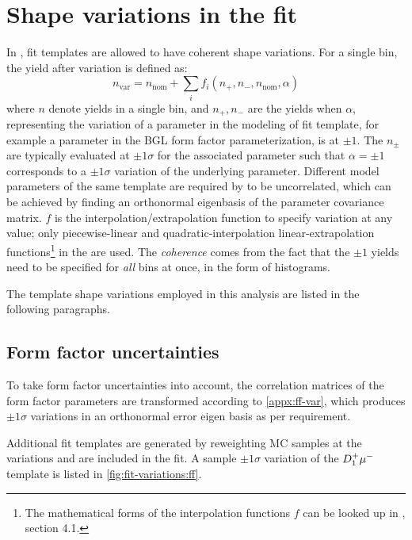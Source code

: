 \section{Shape variations in the fit}
\label{ref:fit:var}

In \HistFactory, fit templates are allowed to have coherent shape variations.
For a single bin, the yield after variation is defined as:
\begin{equation}
    n_\text{var} = n_\text{nom} + \sum_i f_i(n_+, n_-, n_\text{nom}, \alpha)
\end{equation}
where $n$ denote yields in a single bin, and
$n_+, n_-$ are the yields when $\alpha$,
representing the variation of a parameter in the modeling of fit template,
for example a parameter in the BGL form factor parameterization,
is at $\pm 1$.
The $n_\pm$ are typically evaluated at $\pm 1 \sigma$ for the associated
parameter such that $\alpha = \pm 1$ corresponds to a $\pm 1 \sigma$ variation
of the underlying parameter.
Different model parameters of the same template are required by \HistFactory to
be uncorrelated,
which can be achieved by finding an orthonormal eigenbasis of the parameter
covariance matrix.
$f$ is the interpolation/extrapolation function to specify variation
at any value;
only piecewise-linear and quadratic-interpolation linear-extrapolation
functions\footnote{
    The mathematical forms of the interpolation functions $f$ can be looked
    up in \cite{Cranmer:2012sba}, section 4.1.
} in the \HistFactory are used.
The \emph{coherence} comes from the fact that the $\pm 1$ yields need to be
specified for \emph{all} bins at once, in the form of histograms.

The template shape variations employed in this analysis are listed in the
following paragraphs.


\subsection{Form factor uncertainties}

To take form factor uncertainties into account, the correlation
matrices of the form factor parameters are transformed
according to \cref{appx:ff-var}, which produces $\pm 1\sigma$ variations
in an orthonormal error eigen basis as per \HistFactory requirement.

Additional fit templates are generated by reweighting MC samples at the
variations and are included in the fit.
A sample $\pm 1\sigma$ variation of the $D_1^+{\mu^-}$ template is listed in
\cref{fig:fit-variations:ff}.

